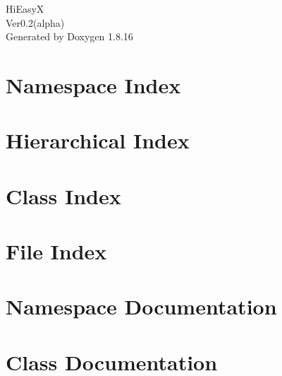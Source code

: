 \let\mypdfximage\pdfximage\def\pdfximage{\immediate\mypdfximage}\documentclass[twoside]{book}
\newcommand{\+}{\discretionary{\mbox{\scriptsize$\hookleftarrow$}}{}{}}
\newcommand{\clearemptydoublepage}{%
  \newpage{\pagestyle{empty}\cleardoublepage}%
}
\begin{document}
\hypersetup{pageanchor=false,
             bookmarksnumbered=true,
             pdfencoding=unicode
            }
\begin{titlepage}
\vspace*{7cm}
\begin{center}%
{\Large Hi\+EasyX \\[1ex]\large Ver0.\+2(alpha) }\\
\vspace*{1cm}
{\large Generated by Doxygen 1.8.16}\\
\end{center}
\end{titlepage}
\clearemptydoublepage
{}
\tableofcontents
\clearemptydoublepage
{}
\hypersetup{pageanchor=true}

\chapter{Namespace Index}

\chapter{Hierarchical Index}

\chapter{Class Index}

\chapter{File Index}

\chapter{Namespace Documentation}

\chapter{Class Documentation}





























\end{document}
